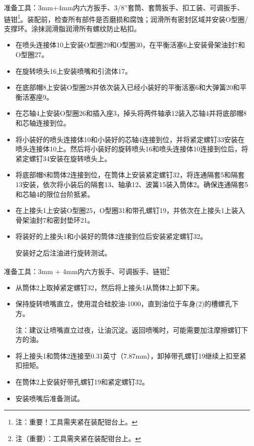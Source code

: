 准备工具：3mm+4mm内六方扳手、3/8''套筒、套筒扳手、扣工装、可调扳手、链钳\footnote{注：重要！工具需夹紧在装配钳台上。}。装配前，检查所有部件是否磨损和腐蚀；润滑所有密封区域并安装O型圈/支撑环。涂抹润滑脂润滑所有螺纹防止粘扣。
\begin{itemize}
	\item 在喷头连接体10上安装O型圈29和O型圈30，在平衡活塞6上安装骨架油封7和O型圈27。
	
	\item 在旋转喷头16上安装喷嘴和引流体17。
	
	\item 在底部帽8上安装O型圈28并依次装入已经小装好的平衡活塞6和大弹簧20和平衡活塞座9。
	
	\item 在芯轴4上安装O型圈26和插入座3，掉头将两件轴承12装入芯轴4并将底部帽8和芯轴连接到位。
	
	\item 将小装好的喷头连接体10和小装好的芯轴4连接到位，并将紧定螺钉33安装在喷头连接体10上。然后将小装好的旋转喷头16和喷头连接体10连接到位后，将紧定螺钉34安装在旋转喷头上。
	
	\item 将底部帽8和筒体2连接到位，在筒体上安装紧定螺钉32，将连通隔套5和隔套13安装，依次将小装后的隔套13、轴承12、波簧15装入筒体2。确保连通隔套5和芯轴4的限位台阶抵紧。
	
	\item 在上接头1上安装O型圈25，O型圈31和带孔螺钉19，并依次在上接头1上装入骨架油封7和密封垫环21。
	
	\item 将装好的上接头1和小装好的筒体2连接到位后安装紧定螺钉32。
	
	安装好之后注油进行旋转测试。
\end{itemize}
	
	

准备工具：3mm + 4mm内六方扳手、可调扳手、链钳\footnote{
注（重要）：工具需夹紧在装配钳台上。}

\begin{itemize}

	\item 从筒体2上取掉紧定螺钉32，然后将上接头1从筒体2上卸下来。
 
	\item 保持旋转喷嘴直立，使用混合硅胶油-1000，直到油位于车身(2)的槽螺孔下方。
 
注：建议让喷嘴直立过夜，让油沉淀。返回喷嘴时，可能需要加注摩擦螺钉下方的油。

	\item 将上接头1和筒体2连接至0.31英寸（7.87mm），卸掉带孔螺钉19继续上扣至紧扣扭矩。
	
	\item 在筒体2上安装好带孔螺钉19和紧定螺钉32。
 
	\item 安装喷嘴后准备测试。
	\end{itemize}
	
